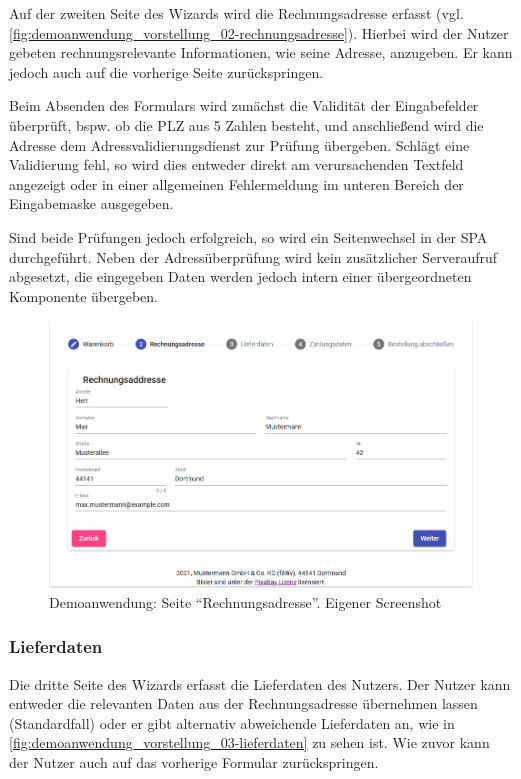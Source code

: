 Auf der zweiten Seite des Wizards wird die Rechnungsadresse erfasst (vgl. \autoref{fig:demoanwendung_vorstellung_02-rechnungsadresse}). Hierbei wird der Nutzer gebeten rechnungsrelevante Informationen, wie seine Adresse, anzugeben. Er kann jedoch auch auf die vorherige Seite zurückspringen.

Beim Absenden des Formulars wird zunächst die Validität der Eingabefelder überprüft, bspw. ob die PLZ aus 5 Zahlen besteht, und anschließend wird die Adresse dem Adressvalidierungsdienst zur Prüfung übergeben. Schlägt eine Validierung fehl, so wird dies entweder direkt am verursachenden Textfeld angezeigt oder in einer allgemeinen Fehlermeldung im unteren Bereich der Eingabemaske ausgegeben.

Sind beide Prüfungen jedoch erfolgreich, so wird ein Seitenwechsel in der SPA durchgeführt. Neben der Adressüberprüfung wird kein zusätzlicher Serveraufruf abgesetzt, die eingegeben Daten werden jedoch intern einer übergeordneten Komponente übergeben.

\begin{figure}[H]
	\centering
	\includegraphics[width=1.00\linewidth]{img/04_erstellung-poc/demoanwendung_vorstellung_02-rechnungsadresse.png}
	\caption{Demoanwendung: Seite \enquote{Rechnungsadresse}. Eigener Screenshot}
	\label{fig:demoanwendung_vorstellung_02-rechnungsadresse}
\end{figure}

\newpage

\subsubsection{Lieferdaten}

Die dritte Seite des Wizards erfasst die Lieferdaten des Nutzers. Der Nutzer kann entweder die relevanten Daten aus der Rechnungsadresse übernehmen lassen (Standardfall) oder er gibt alternativ abweichende Lieferdaten an, wie in \autoref{fig:demoanwendung_vorstellung_03-lieferdaten} zu sehen ist. Wie zuvor kann der Nutzer auch auf das vorherige Formular zurückspringen.

